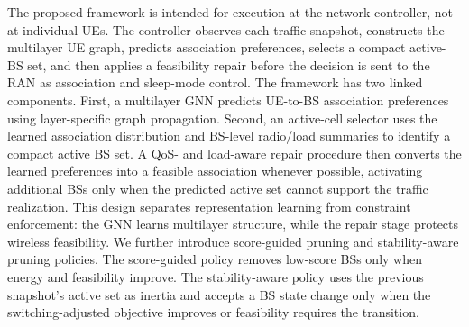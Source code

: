 \documentclass[journal]{IEEEtran}
\begin{document}
The proposed framework is intended for execution at the network controller,
not at individual UEs. The controller observes each traffic snapshot, constructs
the multilayer UE graph, predicts association preferences, selects a compact
active-BS set, and then applies a feasibility repair before the decision is sent
to the RAN as association and sleep-mode control. The framework has two linked
components. First, a multilayer GNN
predicts UE-to-BS association preferences using layer-specific graph
propagation. Second, an active-cell selector uses the learned association
distribution and BS-level radio/load summaries to identify a compact active BS
set. A QoS- and load-aware repair procedure then converts the learned
preferences into a feasible association whenever possible, activating
additional BSs only when the predicted active set cannot support the traffic
realization. This design separates representation learning from constraint
enforcement: the GNN learns multilayer structure, while the repair stage
protects wireless feasibility. We further introduce score-guided pruning and
stability-aware pruning policies. The score-guided policy removes low-score
BSs only when energy and feasibility improve. The stability-aware policy uses
the previous snapshot's active set as inertia and accepts a BS state change
only when the switching-adjusted objective improves or feasibility requires the
transition.
\end{document}
